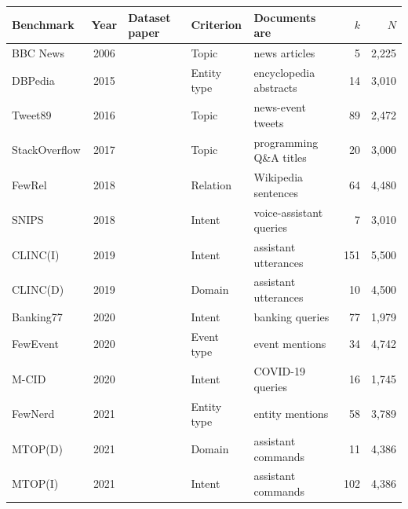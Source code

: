 \documentclass[11pt,a4paper,oneside]{report}
\begin{document}
\begin{table}[!htbp]
\centering
\footnotesize
\setlength{\tabcolsep}{3.5pt}
\renewcommand{\arraystretch}{1.12}
\begin{tabularx}{\textwidth}{@{}l c >{\raggedright\arraybackslash}p{3.15cm} l >{\raggedright\arraybackslash}X r r@{}}
\toprule
\textbf{Benchmark} & \textbf{Year} & \textbf{Dataset paper} & \textbf{Criterion} & \textbf{Documents are} & \textbf{$k$} & \textbf{$N$} \\
\midrule
BBC News      & 2006 & \citet{greene2006bbc}          & Topic       & news articles              & 5   & 2{,}225 \\
DBPedia       & 2015 & \citet{zhang2015character}     & Entity type & encyclopedia abstracts     & 14  & 3{,}010 \\
Tweet89       & 2016 & \citet{yin2016model}           & Topic       & news-event tweets          & 89  & 2{,}472 \\
StackOverflow & 2017 & \citet{xu2017selftaught}       & Topic       & programming Q\&A titles    & 20  & 3{,}000 \\
FewRel        & 2018 & \citet{han2018fewrel}          & Relation    & Wikipedia sentences        & 64  & 4{,}480 \\
SNIPS         & 2018 & \citet{coucke2018snips}        & Intent      & voice-assistant queries    & 7   & 3{,}010 \\
CLINC(I)      & 2019 & \citet{larson2019clinc}        & Intent      & assistant utterances       & 151 & 5{,}500 \\
CLINC(D)      & 2019 & \citet{larson2019clinc}        & Domain      & assistant utterances       & 10  & 4{,}500 \\
Banking77     & 2020 & \citet{casanueva2020banking77} & Intent      & banking queries            & 77  & 1{,}979 \\
FewEvent      & 2020 & \citet{deng2020fewevent}       & Event type  & event mentions             & 34  & 4{,}742 \\
M-CID         & 2020 & \citet{arora2020mcid}          & Intent      & COVID-19 queries           & 16  & 1{,}745 \\
FewNerd       & 2021 & \citet{ding2021fewnerd}        & Entity type & entity mentions            & 58  & 3{,}789 \\
MTOP(D)       & 2021 & \citet{li2021mtop}             & Domain      & assistant commands         & 11  & 4{,}386 \\
MTOP(I)       & 2021 & \citet{li2021mtop}             & Intent      & assistant commands         & 102 & 4{,}386 \\

\end{tabularx}
\end{table}
\end{document}
